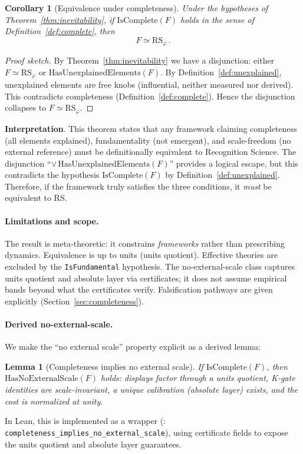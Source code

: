 \documentclass[12pt]{article}
\newtheorem{lemma}[theorem]{Lemma}
\newtheorem{corollary}[theorem]{Corollary}
\theoremstyle{remark}
\begin{document}
\begin{corollary}[Equivalence under completeness]\label{cor:equivalence}
Under the hypotheses of Theorem~\ref{thm:inevitability}, if $\mathrm{IsComplete}(F)$ holds in the sense of Definition~\ref{def:complete}, then
\[
F \simeq \mathrm{RS}_\varphi\,.
\]
\end{corollary}

\begin{proof}[Proof sketch]
By Theorem~\ref{thm:inevitability} we have a disjunction: either $F \simeq \mathrm{RS}_\varphi$ or $\mathrm{HasUnexplainedElements}(F)$. By Definition~\ref{def:unexplained}, unexplained elements are free knobs (influential, neither measured nor derived). This contradicts completeness (Definition~\ref{def:complete}). Hence the disjunction collapses to $F \simeq \mathrm{RS}_\varphi$.
\end{proof}

\textbf{Interpretation}. This theorem states that any framework claiming completeness (all elements explained), fundamentality (not emergent), and scale-freedom (no external reference) must be definitionally equivalent to Recognition Science. The disjunction ``$\lor\, \mathrm{HasUnexplainedElements}(F)$'' provides a logical escape, but this contradicts the hypothesis $\mathrm{IsComplete}(F)$ by Definition~\ref{def:unexplained}. Therefore, if the framework truly satisfies the three conditions, it \emph{must} be equivalent to RS.

\paragraph{Limitations and scope.} The result is meta-theoretic: it constrains \emph{frameworks} rather than prescribing dynamics. Equivalence is up to units (units quotient). Effective theories are excluded by the \texttt{IsFundamental} hypothesis. The no-external-scale class captures units quotient and absolute layer via certificates; it does not assume empirical bands beyond what the certificates verify. Falsification pathways are given explicitly (Section~\ref{sec:completeness}).

\paragraph{Derived no-external-scale.} We make the ``no external scale'' property explicit as a derived lemma:
\begin{lemma}[Completeness implies no external scale]\label{lem:complete-no-external-scale}
If $\mathrm{IsComplete}(F)$, then $\mathrm{HasNoExternalScale}(F)$ holds: displays factor through a units quotient, K-gate identities are scale-invariant, a unique calibration (absolute layer) exists, and the cost is normalized at unity.
\end{lemma}
In Lean, this is implemented as a wrapper (: \texttt{completeness\_implies\_no\_external\_scale}), using certificate fields to expose the units quotient and absolute layer guarantees.
\end{document}
